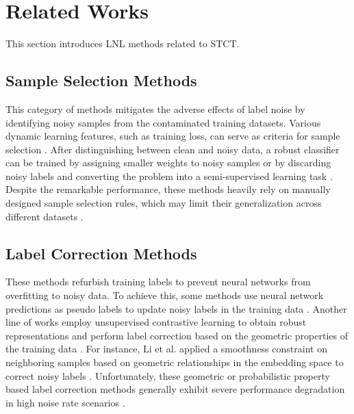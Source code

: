 \section{Related Works}
\noindent This section introduces LNL methods related to STCT.

\subsection{Sample Selection Methods}

This category of methods mitigates the adverse effects of label noise by identifying noisy samples from the contaminated training datasets. Various dynamic learning features, such as training loss, can serve as criteria for sample selection \cite{dividemix, mild}. After distinguishing between clean and noisy data, a robust classifier can be trained by assigning smaller weights to noisy samples \cite{reweight1,reweight2, reweight3, reweight4, reweight5} or by discarding noisy labels and converting the problem into a semi-supervised learning task \cite{dividemix, c2d, mild, codis, feddiv}. Despite the remarkable performance, these methods heavily rely on manually designed sample selection rules, which may limit their generalization across different datasets \cite{lnl_survey}.

\subsection{Label Correction Methods}

These methods refurbish training labels to prevent neural networks from overfitting to noisy data. To achieve this, some methods use neural network predictions as pseudo labels to update noisy labels in the training data \cite{pencil, dividemix, label_correction1, label_correction2}. Another line of works employ unsupervised contrastive learning to obtain robust representations and perform label correction based on the geometric properties of the training data \cite{tcl, rrl, label_correction3}. For instance, Li et al. applied a smoothness constraint on neighboring samples based on geometric relationships in the embedding space to correct noisy labels \cite{rrl}. Unfortunately, these geometric or probabilistic property based label correction methods generally exhibit severe performance degradation in high noise rate scenarios \cite{label_correction3, label_correction4}.

